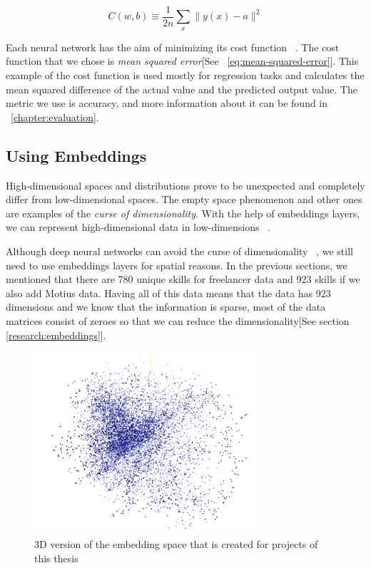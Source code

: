 \begin{equation}
C(w, b) \equiv \frac{1}{2 n} \sum_{x}\|y(x)-a\|^{2}
\label{eq:mean-squared-error}
\end{equation}

Each neural network has the aim of minimizing its cost function ~\parencite{Goodfellow-et-al-2016}. The cost function that we chose is \textit{mean squared error}[See ~\autoref{eq:mean-squared-error}]. This example of the cost function is used mostly for regression tasks and calculates the mean squared difference of the actual value and the predicted output value. The metric we use is accuracy, and more information about it can be found in ~\autoref{chapter:evaluation}.


\subsection{Using Embeddings}\label{subsection:using-embeddings}

High-dimensional spaces and distributions prove to be unexpected and completely differ from low-dimensional spaces. The empty space phenomenon and other ones are examples of the \textit{curse of dimensionality}. With the help of embeddings layers, we can represent high-dimensional data in low-dimensions  ~\parencite{lee2007nonlinear}.


Although deep neural networks can avoid the curse of dimensionality ~\parencite{poggio2017and}, we still need to use embeddings layers for spatial reasons. In the previous sections, we mentioned that there are 780 unique skills for freelancer data and 923 skills if we also add Motius data. Having all of this data means that the data has 923 dimensions and we know that the information is sparse, most of the data matrices consist of zeroes so that we can reduce the dimensionality[See section \ref{research:embeddings}].

 \begin{figure}[htp]
	\centering
	\includegraphics[width=0.75\textwidth]{figures/EmbeddingThesis.png}
	\caption{3D version of the embedding space that is created for projects of this thesis}
	\label{fig:embedding-projection}
\end{figure}


